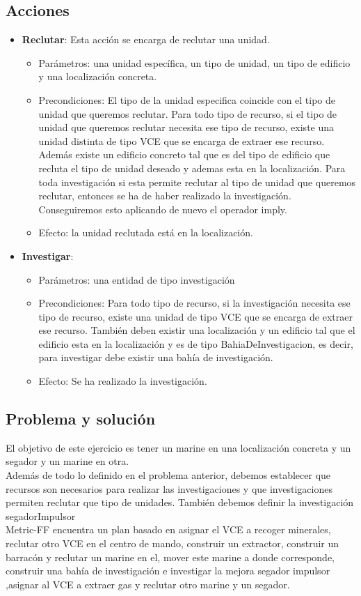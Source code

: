 \subsection{Acciones}
\begin{itemize}
   \item \textbf{Reclutar}: Esta acción se encarga de reclutar una unidad.
   \begin{itemize}
      \item Parámetros: una unidad específica, un tipo de unidad, un tipo de edificio y una localización concreta.
      \item Precondiciones: El tipo de la unidad especifica coincide con el tipo de unidad que queremos reclutar. Para todo tipo de recurso, si el tipo de unidad que queremos reclutar necesita ese tipo de recurso, existe una unidad distinta de tipo VCE que se encarga de extraer ese recurso. Además existe un edificio concreto tal que es del tipo de edificio que recluta el tipo de unidad deseado y ademas esta en la localización. Para toda investigación si esta permite reclutar al tipo de unidad que queremos reclutar, entonces se ha de haber realizado la investigación. Conseguiremos esto aplicando de nuevo el operador imply.
      \item Efecto: la unidad reclutada está en la localización.
   \end{itemize}
   \item \textbf{Investigar}:
   \begin{itemize}
      \item Parámetros: una entidad de tipo investigación
      \item Precondiciones: Para todo tipo de recurso, si la investigación necesita ese tipo de recurso, existe una unidad de tipo VCE que se encarga de extraer ese recurso. También deben existir una localización y un edificio tal que el edificio esta en la localización y es de tipo BahiaDeInvestigacion, es decir, para investigar debe existir una bahía de investigación.
      \item Efecto: Se ha realizado la investigación.
   \end{itemize}
\end{itemize}
\subsection{Problema y solución}
El objetivo de este ejercicio es tener un marine en una localización concreta y un segador y un marine en otra.\\
Además de todo lo definido en el problema anterior, debemos establecer que recursos son necesarios para realizar las investigaciones y que investigaciones permiten reclutar que tipo de unidades. También debemos definir la investigación segadorImpulsor\\
Metric-FF encuentra un plan basado en asignar el VCE a recoger minerales, reclutar otro VCE en el centro de mando, construir un extractor, construir un barracón y reclutar un marine en el, mover este marine a donde corresponde, construir una bahía de investigación e investigar la mejora segador impulsor ,asignar al VCE a extraer gas y reclutar otro marine y un segador.


